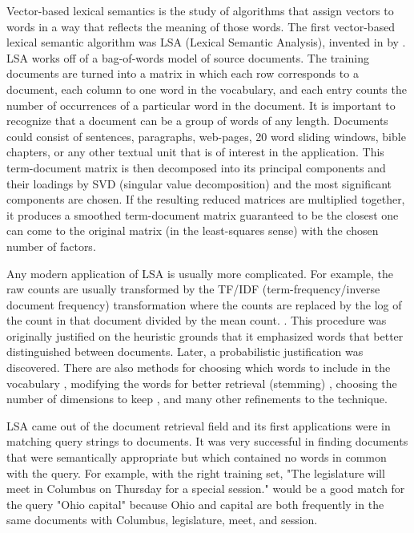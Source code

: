 \documentclass[eric_thesis.tex]{subfiles}
\begin{document}
Vector-based lexical semantics is the study of algorithms that assign vectors to 
words in a way that reflects the meaning of those words. The first vector-based 
lexical semantic algorithm was LSA (Lexical Semantic Analysis), invented in 
 by . LSA works off of a bag-of-words model of 
source documents. The training documents are turned into a matrix in which each 
row corresponds to a document, each column to one word in the vocabulary, and 
each entry counts the number of occurrences of a particular word in the 
document. It is important to recognize that a document can be a group of words 
of any length. Documents could consist of sentences, paragraphs, web-pages, 20 
word sliding windows, bible chapters, or any other textual unit that is of 
interest in the application. This term-document matrix is then decomposed into 
its principal components and their loadings by SVD (singular value 
decomposition) and the most significant components are chosen. If the resulting 
reduced matrices are multiplied together, it produces a smoothed term-document 
matrix guaranteed to be the closest one can come to the original matrix (in the 
least-squares sense) with the chosen number of factors.


Any modern application of LSA is usually more complicated. For example, the raw 
counts are usually transformed by the TF/IDF (term-frequency/inverse document 
frequency) transformation where the counts are replaced by the log of the count 
in that document divided by the mean count. . This procedure was originally justified on the heuristic 
grounds that it emphasized words that better distinguished between documents. 
 Later, a probabilistic justification was discovered.  There 
are also methods for choosing which words to include in the vocabulary 
, modifying the words for better retrieval (stemming) , 
choosing the number of dimensions to keep , and many other refinements 
to the technique.

LSA came out of the document retrieval field and its first applications were in 
matching query strings to documents. It was very successful in finding documents 
that were semantically appropriate but which contained no words in common with 
the query. For example, with the right training set, "The legislature will meet 
in Columbus on Thursday for a special session." would be a good match for the 
query "Ohio capital" because Ohio and capital are both frequently in the same 
documents with Columbus, legislature, meet, and session.
\end{document}
